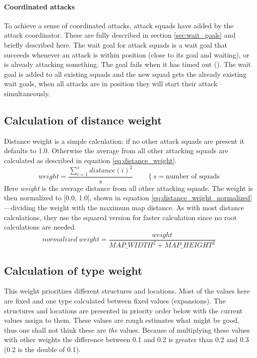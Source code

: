 \paragraph{Coordinated attacks}
To achieve a sense of coordinated attacks, attack squads have  added by the attack coordinator. These are fully described in section \ref{sec:wait_goals} and briefly described here. The wait goal for attack squads is a wait goal that succeeds whenever an attack is within position (close to its goal and waiting), or is already attacking something. The goal fails when it has timed out (\attackCoordinatorWaitGoalTimeout). The wait goal is added to all existing squads and the new squad gets the already existing wait goals, when all attacks are in position they will start their attack simultaneously.

\subsection{Calculation of distance weight}
Distance weight is a simple calculation: if no other attack squads are present it defaults to 1.0. Otherwise the average from all other attacking squads are calculated as described in equation \ref{eq:distance_weight}.
\begin{equation}
\label{eq:distance_weight}
weight = \frac{\sum_{i=1}^{s}{distance(i)^2}}{s} \qquad \left\{s = \text{number of squads}\right.
\end{equation}
Here \emph{weight} is the average distance from all other attacking squads. The weight is then normalized to [0.0, 1.0], shown in equation \ref{eq:distance_weight_normalized}—dividing the weight with the maximum map distance. As with most distance calculations, they use the squared version for faster calculation since no root calculations are needed.
\begin{equation}
\label{eq:distance_weight_normalized}
normalized\ weight = \frac{weight}{MAP\_WIDTH^2 + MAP\_HEIGHT^2}
\end{equation}


\subsection{Calculation of type weight}
This weight prioritizes different structures and locations. Most of the values here are fixed and one type calculated between fixed values (expansions). The structures and locations are presented in priority order below with the current values assign to them. These values are rough estimates what might be good, thus one shall not think these are \emph{the} values. Because of multiplying these values with other weights the difference between 0.1 and 0.2 is greater than 0.2 and 0.3 (0.2 is the double of 0.1).

